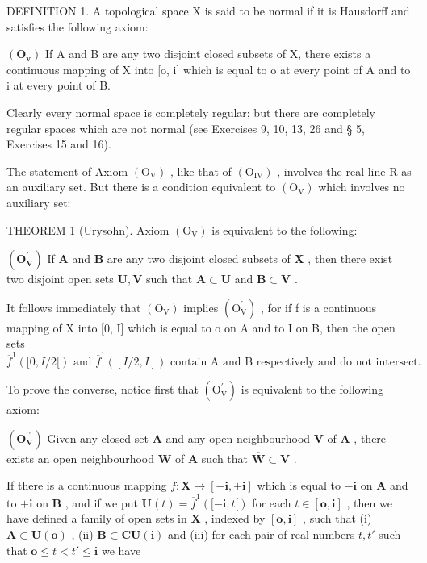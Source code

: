 DEFINITION 1. A topological space X is said to be normal if it is Hausdorff and satisfies the following axiom:

\((\mathbf{O}_{\mathbf{v}})\) If A and B are any two disjoint closed subsets of X, there exists a continuous mapping of X into {[}o, i{]} which is equal to o at every point of A and to i at every point of B.

Clearly every normal space is completely regular; but there are completely regular spaces which are not normal (see Exercises 9, 10, 13, 26 and § 5, Exercises 15 and 16).

The statement of Axiom \((\mathrm{O}_{\mathrm{V}})\) , like that of \((\mathrm{O}_{\mathrm{IV}})\) , involves the real line R as an auxiliary set. But there is a condition equivalent to \((\mathrm{O}_{\mathrm{V}})\) which involves no auxiliary set:

THEOREM 1 (Urysohn). Axiom \((\mathrm{O}_{\mathrm{V}})\) is equivalent to the following:

\((\mathbf{O}_{\mathbf{V}}^{\prime})\) If \(\mathbf{A}\) and \(\mathbf{B}\) are any two disjoint closed subsets of \(\mathbf{X}\) , then there exist two disjoint open sets \(\mathbf{U}, \mathbf{V}\) such that \(\mathbf{A} \subset \mathbf{U}\) and \(\mathbf{B} \subset \mathbf{V}\) .

It follows immediately that \((\mathrm{O}_{\mathrm{V}})\) implies \((\mathrm{O}_{\mathrm{V}}^{\prime})\) , for if f is a continuous mapping of X into {[}0, I{]} which is equal to o on A and to I on B, then the open sets \(\overline{f}^{1}([0, I/2[)\text{ and }\overline{f}^{1}([I/2,I])\text{ contain A and B respectively and do not intersect.}\)

To prove the converse, notice first that \((\mathrm{O}_{\mathrm{V}}^{\prime})\) is equivalent to the following axiom:

\((\mathbf{O}_{\mathbf{V}}^{\prime \prime})\) Given any closed set \(\mathbf{A}\) and any open neighbourhood \(\mathbf{V}\) of \(\mathbf{A}\) , there exists an open neighbourhood \(\mathbf{W}\) of \(\mathbf{A}\) such that \(\overline{\mathbf{W}} \subset \mathbf{V}\) .

If there is a continuous mapping \(f: \mathbf{X} \to [-\mathbf{i}, +\mathbf{i}]\) which is equal to \(-\mathbf{i}\) on \(\mathbf{A}\) and to \(+\mathbf{i}\) on \(\mathbf{B}\) , and if we put \(\mathbf{U}(t) = \overline{f}^1([-\mathbf{i}, t[)\) for each \(t \in [\mathbf{o}, \mathbf{i}]\) , then we have defined a family of open sets in \(\mathbf{X}\) , indexed by \([\mathbf{o}, \mathbf{i}]\) , such that (i) \(\mathbf{A} \subset \mathbf{U}(\mathbf{o})\) , (ii) \(\mathbf{B} \subset \mathbf{C}\mathbf{U}(\mathbf{i})\) and (iii) for each pair of real numbers \(t, t'\) such that \(\mathbf{o} \leqslant t < t' \leqslant \mathbf{i}\) we have

